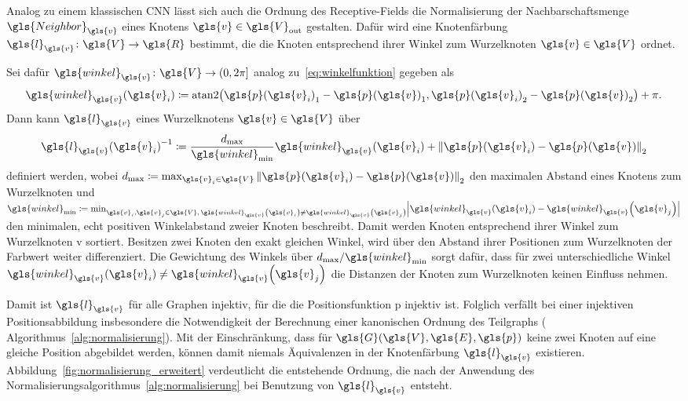 Analog zu einem klassischen \gls{CNN} lässt sich auch die Ordnung des Receptive-Fields \bzw{} die Normalisierung der Nachbarschaftsmenge $\gls{Neighbor}_{\gls{v}}$ eines Knotens $\gls{v} \in \gls{V}_{\mathrm{out}}$ gestalten.
Dafür wird eine Knotenfärbung $\gls{l}_{\gls{v}} \colon \gls{V} \to \gls{R}$ bestimmt, die die Knoten entsprechend ihrer Winkel zum Wurzelknoten $\gls{v} \in \gls{V}$ ordnet.

Sei dafür $\gls{winkel}_{\gls{v}} \colon \gls{V} \to \left(0, 2\pi\right]$ analog zu~\eqref{eq:winkelfunktion} gegeben als
\begin{equation*}
  \gls{winkel}_{\gls{v}}\left(\gls{v}_i\right) \coloneqq \mathrm{atan2}\left({\gls{p}\left(\gls{v}_i\right)}_1 - {\gls{p}\left(\gls{v}\right)}_1, {\gls{p}\left(\gls{v}_i\right)}_2 - {\gls{p}\left(\gls{v}\right)}_2\right) + \pi.
\end{equation*}
Dann kann $\gls{l}_{\gls{v}}$ \bzgl{} eines Wurzelknotens $\gls{v} \in \gls{V}$ über
\begin{equation*}
  {\gls{l}_{\gls{v}}\left(\gls{v}_i\right)}^{-1} \coloneqq \frac{d_{\max}}{\gls{winkel}_{\min}} \gls{winkel}_{\gls{v}}\left(\gls{v}_i\right) + {\left\|\gls{p}\left(\gls{v}_i\right) - \gls{p}\left(\gls{v}\right)\right\|}_2
\end{equation*}
definiert werden, wobei $d_{\max} \coloneqq \max_{\gls{v}_i \in \gls{V}} {\left\| \gls{p}\left(\gls{v}_i\right) - \gls{p}\left(\gls{v}\right) \right\|}_2$ den maximalen Abstand eines Knotens zum Wurzelknoten und $\gls{winkel}_{\min} \coloneqq \min_{\gls{v}_i, \gls{v}_j \in \gls{V},\, \gls{winkel}_{\gls{v}}\left(\gls{v}_i\right) \neq \gls{winkel}_{\gls{v}}\left(\gls{v}_j \right)} \left|\gls{winkel}_{\gls{v}}\left(\gls{v}_i\right) - \gls{winkel}_{\gls{v}}\left(\gls{v}_j\right)\right|$ den minimalen, echt positiven Winkelabstand zweier Knoten beschreibt.
Damit werden Knoten entsprechend ihrer Winkel zum Wurzelknoten \gls{v} sortiert.
Besitzen zwei Knoten den exakt gleichen Winkel, wird über den Abstand ihrer Positionen zum Wurzelknoten der Farbwert weiter differenziert.
Die Gewichtung des Winkels über $d_{\max}/\gls{winkel}_{\min}$ sorgt dafür, dass für zwei unterschiedliche Winkel $\gls{winkel}_{\gls{v}}\left(\gls{v}_i\right) \neq \gls{winkel}_{\gls{v}}\left(\gls{v}_j\right)$ die Distanzen der Knoten zum Wurzelknoten keinen Einfluss nehmen.

Damit ist $\gls{l}_{\gls{v}}$ für alle Graphen injektiv, für die die Positionsfunktion \gls{p} injektiv ist.
Folglich verfällt bei einer injektiven Positionsabbildung insbesondere die Notwendigkeit der Berechnung einer kanonischen Ordnung des Teilgraphs (\vgl{} Algorithmus~\ref{alg:normalisierung}).
Mit der Einschränkung, dass für $\gls{G}\left(\gls{V}, \gls{E}, \gls{p}\right)$ keine zwei Knoten auf eine gleiche Position abgebildet werden, können damit niemals Äquivalenzen in der Knotenfärbung $\gls{l}_{\gls{v}}$ existieren.
Abbildung~\ref{fig:normalisierung_erweitert} verdeutlicht die entstehende Ordnung, die nach der Anwendung des Normalisierungsalgorithmus~\ref{alg:normalisierung} bei Benutzung von $\gls{l}_{\gls{v}}$ entsteht.


